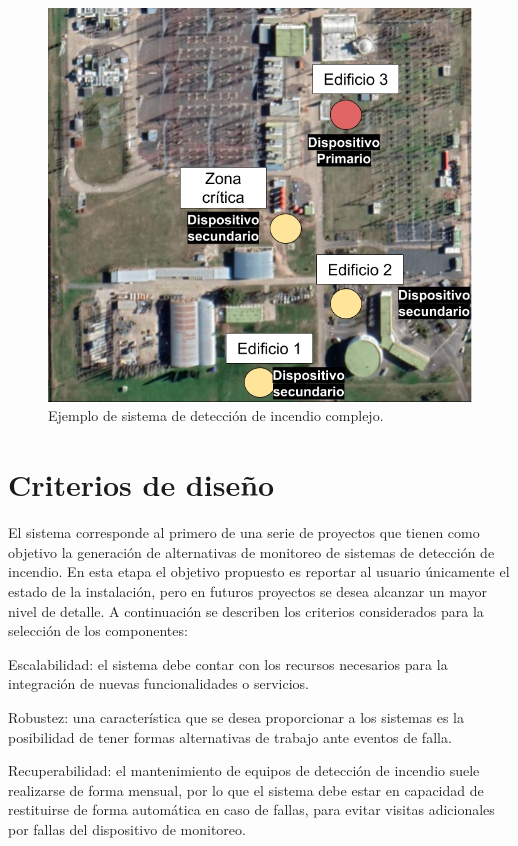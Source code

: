 \begin{figure}[]
	\centering
	\includegraphics[scale=.4]{./Figures/Capitulo3/Fig_A3.png}
	\caption{Ejemplo de sistema de detección de incendio complejo.}
	\label{fig:figura_a3}
\end{figure}

\section{Criterios de diseño}

El sistema corresponde al primero de una serie de proyectos que tienen como objetivo la generación de alternativas de monitoreo de sistemas de detección de incendio. En esta etapa el objetivo propuesto es reportar al usuario únicamente el estado de la instalación, pero en futuros proyectos se desea alcanzar un mayor nivel de detalle. A continuación se describen los criterios considerados para la selección de los componentes:

Escalabilidad: el sistema debe contar con los recursos necesarios para la integración de nuevas funcionalidades o servicios.

Robustez: una característica que se desea proporcionar a los sistemas es la posibilidad de tener formas alternativas de trabajo ante eventos de falla.

Recuperabilidad: el mantenimiento de equipos de detección de incendio suele realizarse de forma mensual, por lo que el sistema debe estar en capacidad de restituirse de forma automática en caso de fallas, para evitar visitas adicionales por fallas del dispositivo de monitoreo.

